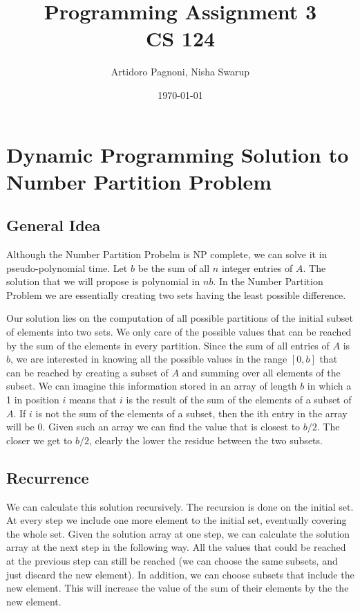 \documentclass[11pt]{article}
\begin{document}
\title{Programming Assignment 3\\
CS 124}
\author{Artidoro Pagnoni, Nisha Swarup}
\date{\today}
\maketitle


\section{Dynamic Programming Solution to Number Partition Problem}
\subsection{General Idea}
Although the Number Partition Probelm is NP complete, we can solve it in pseudo-polynomial time. Let $b$ be the sum of all $n$ integer entries of $A$. The solution that we will propose is polynomial in $nb$. In the Number Partition Problem we are essentially creating two sets having the least possible difference. 

Our solution lies on the computation of all possible partitions of the initial subset of elements into two sets. We only care of the possible values that can be reached by the sum of the elements in every partition. Since the sum of all entries of $A$ is $b$, we are interested in knowing all the possible values in the range $[0,b]$ that can be reached by creating a subset of $A$ and summing over all elements of the subset. We can imagine this information stored in an array of length $b$ in which a 1 in position $i$ means that $i$ is the result of the sum of the elements of a subset of $A$. If $i$ is not the sum of the elements of a subset, then the ith entry in the array will be 0.  Given such an array we can find the value that is closest to $b/2$. The closer we get to $b/2$, clearly the lower the residue between the two subsets. 

\subsection{Recurrence}
We can calculate this solution recursively. The recursion is done on the initial set. At every step we include one more element to the initial set, eventually covering the whole set. Given the solution array at one step, we can calculate the solution array at the next step in the following way. All the values that could be reached at the previous step can still be reached (we can choose the same subsets, and just discard the new element). In addition, we can choose subsets that include the new element. This will increase the value of the sum of their elements by the the new element. 
\end{document}
